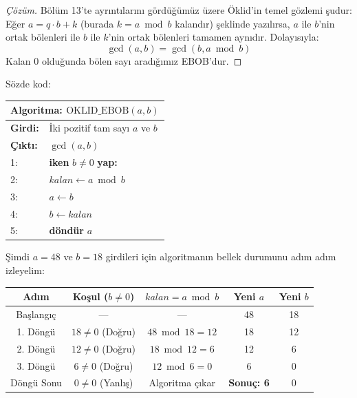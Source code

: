 \begin{proof}[Çözüm]
Bölüm 13'te ayrıntılarını gördüğümüz üzere Öklid'in temel gözlemi şudur: Eğer $a = q \cdot b + k$ (burada $k = a \bmod b$ kalandır) şeklinde yazılırsa, $a$ ile $b$'nin ortak bölenleri ile $b$ ile $k$'nin ortak bölenleri tamamen aynıdır. Dolayısıyla:
\[ \gcd(a, b) = \gcd(b, a \bmod b) \]
Kalan $0$ olduğunda bölen sayı aradığımız EBOB'dur.
\end{proof}

Sözde kod:
\begin{center}
\begin{minipage}{1.0\textwidth}
\begin{tabular}{p{2.4cm}p{9.4cm}}
\hline
\multicolumn{2}{l}{\textbf{Algoritma:} $\text{OKLID\_EBOB}(a, b)$} \\
\hline
\textbf{Girdi:} & İki pozitif tam sayı $a$ ve $b$ \\
\textbf{Çıktı:} & $\gcd(a, b)$ \\
1: & \textbf{iken} $b \neq 0$ \textbf{yap:} \\
2: & \quad $kalan \leftarrow a \bmod b$ \\
3: & \quad $a \leftarrow b$ \\
4: & \quad $b \leftarrow kalan$ \\
5: & \textbf{döndür} $a$ \\
\hline
\end{tabular}
\end{minipage}
\end{center}

Şimdi $a = 48$ ve $b = 18$ girdileri için algoritmanın bellek durumunu adım adım izleyelim:

\begin{center}
\begin{tabular}{|c|c|c|c|c|}
\hline
\textbf{Adım} & \textbf{Koşul ($b \neq 0$)} & $kalan = a \bmod b$ & Yeni $a$ & Yeni $b$ \\
\hline
Başlangıç & --- & --- & 48 & 18 \\
1. Döngü & $18 \neq 0$ (Doğru) & $48 \bmod 18 = 12$ & 18 & 12 \\
2. Döngü & $12 \neq 0$ (Doğru) & $18 \bmod 12 = 6$ & 12 & 6 \\
3. Döngü & $6 \neq 0$ (Doğru) & $12 \bmod 6 = 0$ & 6 & 0 \\
Döngü Sonu & $0 \neq 0$ (Yanlış) & Algoritma çıkar & \textbf{Sonuç: 6} & 0 \\
\hline
\end{tabular}
\end{center}

